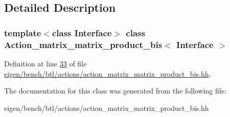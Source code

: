 \subsection{Detailed Description}
\subsubsection*{template$<$class Interface$>$\newline
class Action\+\_\+matrix\+\_\+matrix\+\_\+product\+\_\+bis$<$ Interface $>$}



Definition at line \hyperlink{eigen_2bench_2btl_2actions_2action__matrix__matrix__product__bis_8hh_source_l00033}{33} of file \hyperlink{eigen_2bench_2btl_2actions_2action__matrix__matrix__product__bis_8hh_source}{eigen/bench/btl/actions/action\+\_\+matrix\+\_\+matrix\+\_\+product\+\_\+bis.\+hh}.



The documentation for this class was generated from the following file\+:\begin{DoxyCompactItemize}
\item 
eigen/bench/btl/actions/action\+\_\+matrix\+\_\+matrix\+\_\+product\+\_\+bis.\+hh\end{DoxyCompactItemize}
